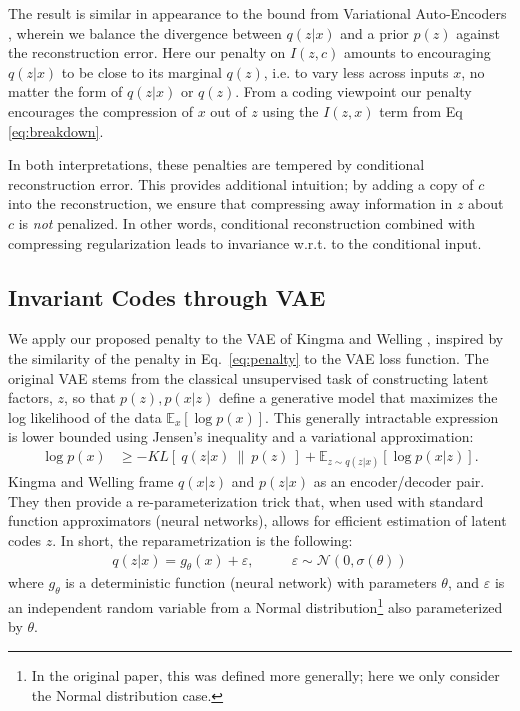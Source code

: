 The result is similar in appearance to the bound from Variational Auto-Encoders \cite{kingma2013auto}, wherein we balance the divergence between $q(z|x)$ and a prior $p(z)$ against the reconstruction error. Here our penalty on $I(z,c)$ amounts to encouraging $q(z|x)$ to be close to its marginal $q(z)$, i.e. to vary less across inputs $x$, no matter the form of $q(z|x)$ or $q(z)$.
From a coding viewpoint our penalty encourages the compression of $x$ out of $z$ using the $I(z, x)$ term from Eq \ref{eq:breakdown}.

In both interpretations, these penalties are tempered by conditional reconstruction error. This provides additional intuition; by adding a copy of $c$ into the reconstruction, we ensure that compressing away information in $z$ about $c$ is \emph{not} penalized. In other words, conditional reconstruction combined with compressing regularization leads to invariance w.r.t. to the conditional input.




\subsection{Invariant Codes through VAE}
\label{subsec:vae}

We apply our proposed penalty to the VAE of Kingma and Welling \cite{kingma2013auto}, inspired by the similarity of the penalty in Eq.~\ref{eq:penalty} to the VAE loss function. The original VAE stems from the classical unsupervised task of constructing latent factors, $z$, so that $p(z), p(x|z)$ define a generative model that maximizes the log likelihood of the data $\mathbb{E}_x[\log p(x)]$. This generally intractable expression is lower bounded using Jensen's inequality and a variational approximation:
\begin{align}
\log p(x) & \geq  -KL[~q(z|x)~\|~p(z)~] + \mathbb{E}_{z \sim q(z|x)}[\log p(x|z)].\label{eq:ae_loss}
\end{align}
Kingma and Welling \cite{kingma2013auto} frame $q(x|z)$ and $p(z|x)$ as an encoder/decoder pair. They then provide a re-parameterization trick that, when used with standard function approximators (neural networks), allows for efficient estimation of latent codes $z$. In short, the reparametrization is the following:
\begin{align}
q(z|x) = g_{\theta}(x) + \varepsilon, ~~~~~~~~~~~~ \varepsilon \sim \mathcal{N}(0,\sigma(\theta))
\end{align}
where $g_\theta$ is a deterministic function (neural network) with parameters $\theta$, and $\varepsilon$ is an independent random variable from a Normal distribution\footnote{In the original paper, this was defined more generally; here we only consider the Normal distribution case.} also parameterized by $\theta$.



